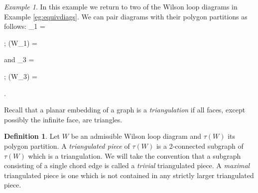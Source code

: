 \documentclass[11pt]{article}
\newcommand{\drawWLD}[2]{

\pgfmathsetmacro{\n}{#1}
\pgfmathsetmacro{\radius}{#2}
\pgfmathsetmacro{\angle}{360/\n}
\draw (0,0) circle (\radius);
    \foreach \i in {1,2,...,\n} {
      \draw (\angle*\i:\radius) node {$\bullet$};
    }

}
\newcommand{\drawpolypart}[2]{
\pgfmathsetmacro{\n}{#1}
\pgfmathsetmacro{\radius}{#2}
\pgfmathsetmacro{\angle}{360/\n}
    \foreach \i in {1,2,...,\n} {
      \draw (\angle*\i+ \angle/2:\radius) node {$\bullet$};
      \pgfmathsetmacro{\x}{\angle*\i - \angle/2}
      \pgfmathsetmacro{\concave}{((\n-1.5)/\n)}
      \draw (\x:\radius cm) .. controls (\angle *\i: \concave* \radius cm) .. (\x + \angle:\radius cm);
    }

}
\newcommand{\drawprop}[4]{
\pgfmathsetmacro{\r}{#1}
\pgfmathsetmacro{\bumpr}{#2}
\pgfmathsetmacro{\s}{#3}
\pgfmathsetmacro{\bumps}{#4}
\pgfmathsetmacro{\perturbe}{\angle/\n}

\begin{scope}
\draw[propagator] (\angle*\r + \angle/2 + \bumpr*\perturbe:\radius) -- (\angle*\s + \angle/2 + \bumps*\perturbe:\radius);
\end{scope}
}
\newcommand{\drawchord}[2]{
\pgfmathsetmacro{\r}{#1}
\pgfmathsetmacro{\s}{#2}

\begin{scope}
\draw (\angle*\r + \angle/2:\radius) -- (\angle*\s + \angle/2:\radius);
\end{scope}
}
\newcommand{\drawnumbers}{
  \foreach \i in {1,2,...,\n} {
  \pgfmathsetmacro{\x}{\angle*\i}
  \draw (\x:\radius*1.15) node {\footnotesize \i};
}
}
\newcommand{\drawnumbersshift}{
  \foreach \i in {1,2,...,\n} {
  \pgfmathsetmacro{\x}{\angle*\i + \angle/2}
  \draw (\x:\radius*1.15) node {\footnotesize \i};
}
}
\def\bas #1\eas{\begin{align*} #1 \end{align*}}
\theoremstyle{remark}
\newtheorem{eg}[thm]{Example}
\theoremstyle{definition}
\newtheorem{dfn}[thm]{Definition}
\begin{document}
\begin{eg}\label{WLDtopolygonpartition}
In this example we return to two of the Wilson loop diagrams in Example \ref{eg:equivdiags}. We can pair diagrams with their polygon partitions as follows:
\bas W_1 =  \quad; \quad
\tau(W_1) = 
\eas and
\bas W_3 = \quad; \quad
\tau(W_3) =  .
\eas

\end{eg}

Recall that a planar embedding of a graph is a \emph{triangulation} if all faces, except possibly the infinite face, are triangles.

\begin{dfn}
  Let $W$ be an admissible Wilson loop diagram and $\tau(W)$ its polygon partition. A \emph{triangulated piece} of $\tau(W)$ is a 2-connected subgraph of $\tau(W)$ which is a triangulation. We will take the convention that a subgraph consisting of a single chord edge is called a \emph{trivial} triangulated piece.
A {\em maximal} triangulated piece is one which is not contained in any strictly larger triangulated piece.
\end{dfn}
\end{document}

